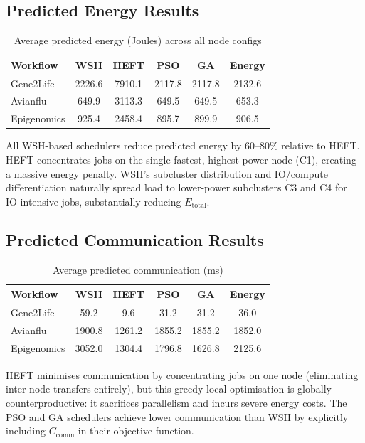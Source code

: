 \documentclass[10pt,twocolumn]{article}
\begin{document}
\subsection{Predicted Energy Results}

\begin{table}[H]
\centering
\caption{Average predicted energy (Joules) across all node configs}
\label{tab:energy}
\begin{tabular}{@{}lccccc@{}}
\toprule
\textbf{Workflow} & \textbf{WSH} & \textbf{HEFT} & \textbf{PSO} & \textbf{GA} & \textbf{Energy}\\
\midrule
Gene2Life   & 2226.6 & 7910.1 & 2117.8 & 2117.8 & 2132.6 \\
Avianflu    &  649.9 & 3113.3 &  649.5 &  649.5 &  653.3 \\
Epigenomics &  925.4 & 2458.4 &  895.7 &  899.9 &  906.5 \\
\bottomrule
\end{tabular}
\end{table}

All WSH-based schedulers reduce predicted energy by 60--80\% relative to HEFT. HEFT
concentrates jobs on the single fastest, highest-power node (C1), creating a massive
energy penalty. WSH's subcluster distribution and IO/compute differentiation
naturally spread load to lower-power subclusters C3 and C4 for IO-intensive jobs,
substantially reducing $E_{\text{total}}$.

\subsection{Predicted Communication Results}

\begin{table}[H]
\centering
\caption{Average predicted communication (ms)}
\label{tab:comm}
\begin{tabular}{@{}lccccc@{}}
\toprule
\textbf{Workflow} & \textbf{WSH} & \textbf{HEFT} & \textbf{PSO} & \textbf{GA} & \textbf{Energy}\\
\midrule
Gene2Life   &   59.2 &    9.6 &   31.2 &   31.2 &   36.0 \\
Avianflu    & 1900.8 & 1261.2 & 1855.2 & 1855.2 & 1852.0 \\
Epigenomics & 3052.0 & 1304.4 & 1796.8 & 1626.8 & 2125.6 \\
\bottomrule
\end{tabular}
\end{table}

HEFT minimises communication by concentrating jobs on one node (eliminating
inter-node transfers entirely), but this greedy local optimisation is globally
counterproductive: it sacrifices parallelism and incurs severe energy costs. The
PSO and GA schedulers achieve lower communication than WSH by explicitly including
$C_{\text{comm}}$ in their objective function.
\end{document}
